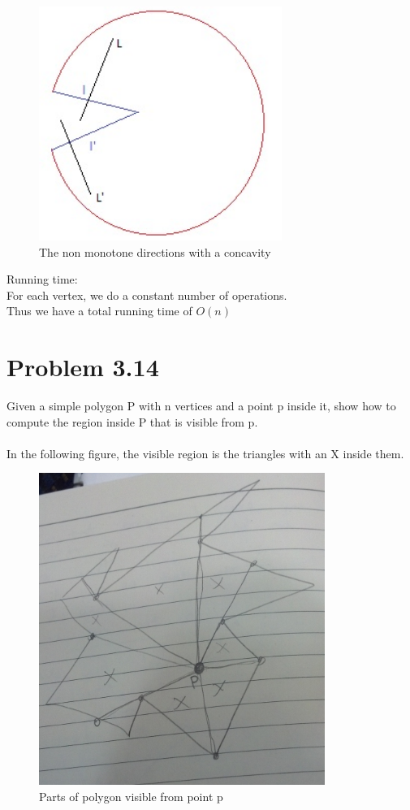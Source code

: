 \documentclass[11pt,psfig]{article}
\begin{document}
\begin{figure}[H]
\centering
\includegraphics[height=3in]{monotone_diagram.jpg}
\caption{The non monotone directions with a concavity}
\end{figure}

Running time:\\
For each vertex, we do a constant number of operations. \\
Thus we have a total running time of $O(n)$

\newpage

\section*{Problem 3.14}

Given a simple polygon P with n vertices and a point p inside it, show
how to compute the region inside P that is visible from p.\\
\\
In the following figure, the visible region is the triangles with an X inside them. \\
\begin{figure}[H]
\centering
\includegraphics[height=4in]{visible_regions.jpg}
\caption{Parts of polygon visible from point p}
\end{figure}
\end{document}
